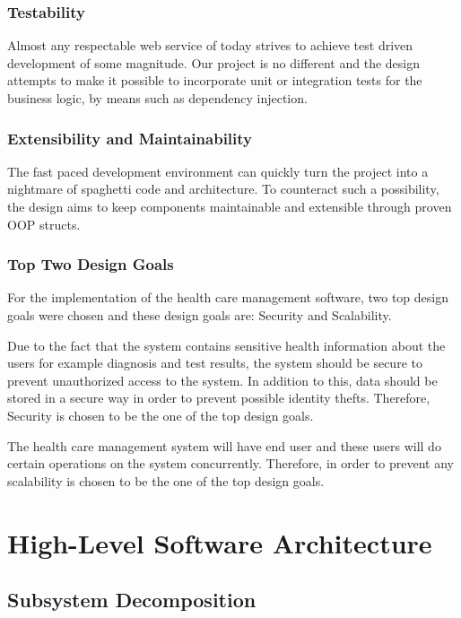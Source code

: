\documentclass[a4paper, 12pt, titlepage]{article}
\begin{document}
  \subsubsection{Testability}

  Almost any respectable web service of today strives to achieve test driven development of some magnitude.
  Our project is no different and the design attempts to make it possible to incorporate unit or integration tests
  for the business logic, by means such as dependency injection.

  \subsubsection{Extensibility and Maintainability}

  The fast paced development environment can quickly turn the project into a nightmare of spaghetti code and architecture.
  To counteract such a possibility, the design aims to keep components maintainable and extensible through proven OOP structs.

  \subsubsection{Top Two Design Goals}

  For the implementation of the health care management software, two top design goals were chosen and these design goals are:
  Security and Scalability.

  Due to the fact that the system contains sensitive health information about the users for example diagnosis and test results,
  the system should be secure to prevent unauthorized access to the system. In addition to this, data should be stored in a secure way
  in order to prevent possible identity thefts. Therefore, Security is chosen to be the one of the top design goals.

  The health care management system will have end user and these users will do certain operations on the system concurrently.
  Therefore, in order to prevent any scalability is chosen to be the one of the top design goals.

  \section{High-Level Software Architecture}

  \subsection{Subsystem Decomposition}
\end{document}
